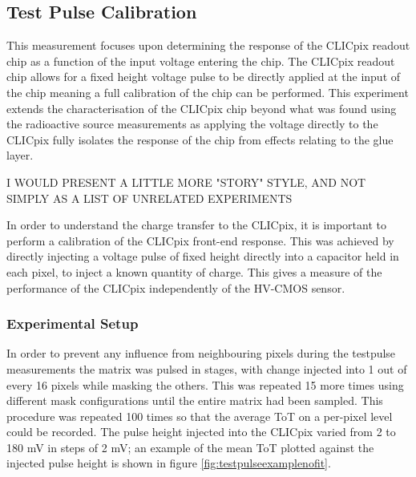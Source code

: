 \subsection{Test Pulse Calibration}


This measurement focuses upon determining the response of the CLICpix readout chip as a function of the input voltage entering the chip.  The CLICpix readout chip allows for a fixed height voltage pulse to be directly applied at the input of the chip meaning a full calibration of the chip can be performed.  This experiment extends the characterisation of the CLICpix chip beyond what was found using the radioactive source measurements as applying the voltage directly to the CLICpix fully isolates the response of the chip from effects relating to the glue layer.  


I WOULD PRESENT A LITTLE MORE "STORY" STYLE, AND NOT SIMPLY AS A LIST OF UNRELATED EXPERIMENTS

In order to understand the charge transfer to the CLICpix, it is important to perform a calibration of the CLICpix front-end response. This was achieved by directly injecting a voltage pulse of fixed height directly into a capacitor held in each pixel, to inject a known quantity of charge. This gives a measure of the performance of the CLICpix independently of the HV-CMOS sensor.  %


\subsubsection{Experimental Setup}

In order to prevent any influence from neighbouring pixels during the testpulse measurements the matrix was pulsed in stages, with change injected into 1 out of every 16 pixels while masking the others.  This was repeated 15 more times using different mask configurations until the entire matrix had been sampled. This procedure was repeated 100 times so that the average ToT on a per-pixel level could be recorded.  The pulse height injected into the CLICpix varied from 2 to 180 mV in steps of 2 mV;  an example of the mean ToT plotted against the injected pulse height is shown in figure \ref{fig:testpulseexamplenofit}.  

